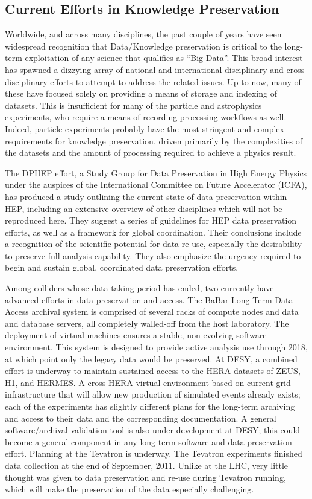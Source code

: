 \subsection{Current Efforts in Knowledge Preservation}
Worldwide, and across many disciplines, the past couple of years have seen widespread 
recognition that Data/Knowledge preservation is critical to the long-term exploitation 
of any science that qualifies as ``Big Data''.  This broad interest has spawned a 
dizzying array of national and international disciplinary and cross-disciplinary 
efforts to attempt to address the related issues.  Up to now, many of these have 
focused solely on providing a means of storage and indexing of datasets.  This is 
insufficient for many of the particle and astrophysics experiments, who require a 
means of recording processing workflows as well.  Indeed, particle experiments 
probably have the most stringent and complex requirements for knowledge 
preservation, driven primarily by the complexities of the datasets and the amount 
of processing required to achieve a physics result.

The DPHEP effort\cite{DPHEP}, a Study Group for Data Preservation in High Energy Physics under the auspices of the International Committee on Future Accelerator (ICFA), has produced a study outlining the current state of data preservation within HEP, including an extensive overview of other disciplines which will not be reproduced here. They suggest a series of guidelines for HEP data preservation efforts, as well as a framework for global coordination.  Their conclusions include a recognition of the scientific potential for data re-use, especially the desirability to preserve full analysis capability.  They also emphasize the urgency required to begin and sustain global, coordinated data preservation efforts.  

Among colliders whose data-taking period has ended, two currently have advanced efforts in data preservation and access.  The BaBar Long Term Data Access archival system\cite{BaBar} is comprised of several racks of compute nodes and data and database servers, all completely walled-off from the host laboratory.  The deployment of virtual machines ensures a stable, non-evolving software environment.  This system is designed to provide active analysis use through 2018, at which point only the legacy data would be preserved.  At DESY, a combined effort is underway to maintain sustained access to the HERA datasets of ZEUS, H1, and HERMES.  A cross-HERA virtual environment based on current grid infrastructure that will allow new production of simulated events already exists; each of the experiments has slightly different plans for the long-term archiving and access to their data and the corresponding documentation.  A general software/archival validation tool is also under development at DESY\cite{DESY}; this could become a general component in any long-term software and data preservation effort.
Planning at the Tevatron is underway\cite{Tevatron}. The Tevatron experiments finished data collection at the end of September, 2011. Unlike at the LHC, very little thought was given to data preservation and re-use during Tevatron running, which will make the preservation of the data especially challenging. 

